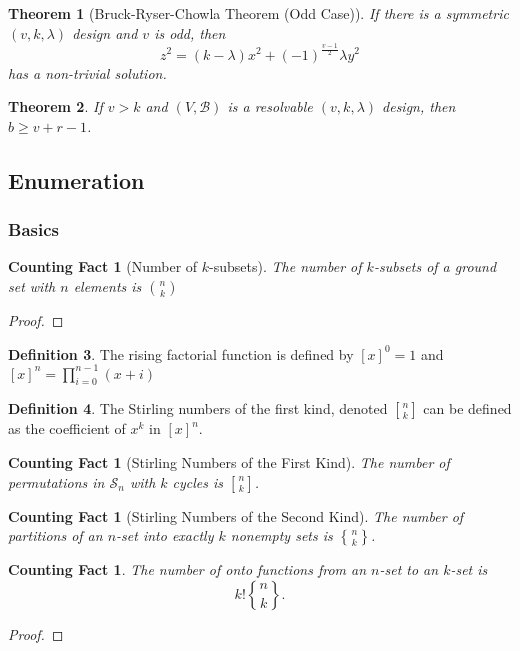 \documentclass[12]{article}
\newcounter{countingFactCounter}
\newtheorem{thm}{Theorem}[section] %
\newtheorem{countingFact}[countingFactCounter]{Counting Fact}
\theoremstyle{definition}
\newtheorem{defn}[thm]{Definition} %
\begin{document}
	\begin{thm}[Bruck-Ryser-Chowla Theorem (Odd Case)]
		If there is a symmetric $(v,k,\lambda)$ design and $v$ is odd, then
		$$z^2 = (k-\lambda)x^2 + (-1)^{\tfrac{v-1}{2}}\lambda y^2$$
		has a non-trivial solution.
	\end{thm}
	
	\begin{thm}
		If $v > k$ and $(V, \mathcal{B})$ is a resolvable $(v, k, \lambda)$ design, then $b \geq v + r-1$.
	\end{thm}
	
	\subsection{Enumeration}
	
	\subsubsection{Basics}
	
	\begin{countingFact}[Number of $k$-subsets]
		The number of $k$-subsets of a ground set with $n$ elements is ${n \choose k}$
	\end{countingFact}
	\begin{proof}
	
	\end{proof}

	\begin{defn}
		The rising factorial function is defined by $[x]^0 = 1$ and $[x]^n = \prod_{i=0}^{n-1} (x+i)$
	\end{defn}

	\begin{defn}
		The Stirling numbers of the first kind, denoted ${n \brack k}$ can be defined as the coefficient of $x^k$ in $[x]^n$.
	\end{defn}
	
	\begin{countingFact}[Stirling Numbers of the First Kind]
		The number of permutations in $\mathcal{S}_n$ with $k$ cycles is ${n \brack k}$.
	\end{countingFact}

	\begin{countingFact}[Stirling Numbers of the Second Kind]
		The number of partitions of an $n$-set into exactly $k$ nonempty sets is ${n \brace k}$.
	\end{countingFact}

	\begin{countingFact}
		The number of onto functions from an $n$-set to an $k$-set is 
		$$k!{n \brace k}.$$
	\end{countingFact}
	\begin{proof}
		
	\end{proof}
\end{document}
